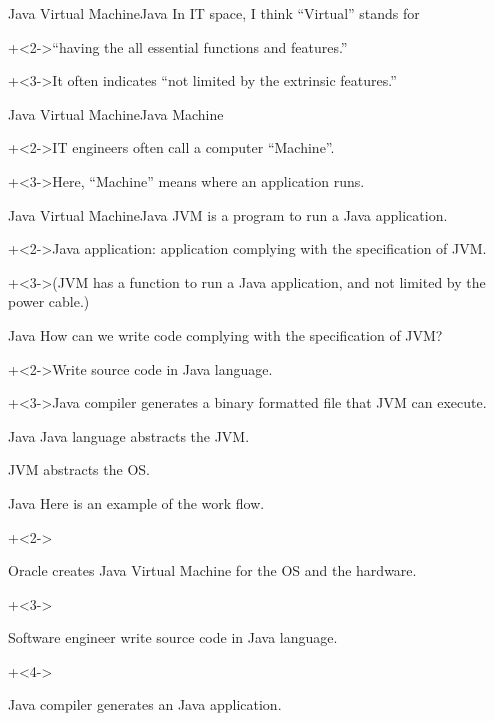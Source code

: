 \begin{frame}{Java Virtual Machine}{Java}
    In IT space, I think ``Virtual'' stands for 
    \vspace{4ex}
    
    \onslide+<2->{``having the all essential functions and features.''}
    \vspace{4ex}

    \onslide+<3->{It often indicates ``not limited by the extrinsic features.''}
\end{frame}


\begin{frame}{Java Virtual Machine}{Java}
    Machine
    \vspace{4ex}

    \onslide+<2->{IT engineers often call a computer ``Machine''.}
    \vspace{4ex}

    \onslide+<3->{Here, ``Machine'' means where an application runs.}
\end{frame}


\begin{frame}{Java Virtual Machine}{Java}
    JVM is a program to run a Java application.
    \vspace{4ex}

    \onslide+<2->{Java application: application complying with the specification of JVM.}
    \vspace{4ex}

    \onslide+<3->{(JVM has a function to run a Java application, and not limited by the power cable.)}
\end{frame}


\begin{frame}{Java}{}
    How can we write code complying with the specification of JVM?
    \vspace{4ex}

    \onslide+<2->{Write source code in Java language.}
    \vspace{4ex}

    \onslide+<3->{Java compiler generates a binary formatted file that JVM can execute.}
\end{frame}


\begin{frame}{Java}{}
    Java language abstracts the JVM.
    \vspace{4ex}

    JVM abstracts the OS.
\end{frame}


\begin{frame}{Java}{}
    Here is an example of the work flow.
    \vspace{4ex}

    \begin{enumerate}
        \onslide+<2->{\item Oracle creates Java Virtual Machine for the OS and the hardware.}
        \onslide+<3->{\item Software engineer write source code in Java language.}
        \onslide+<4->{\item Java compiler generates an Java application.}
    \end{enumerate}
\end{frame}



